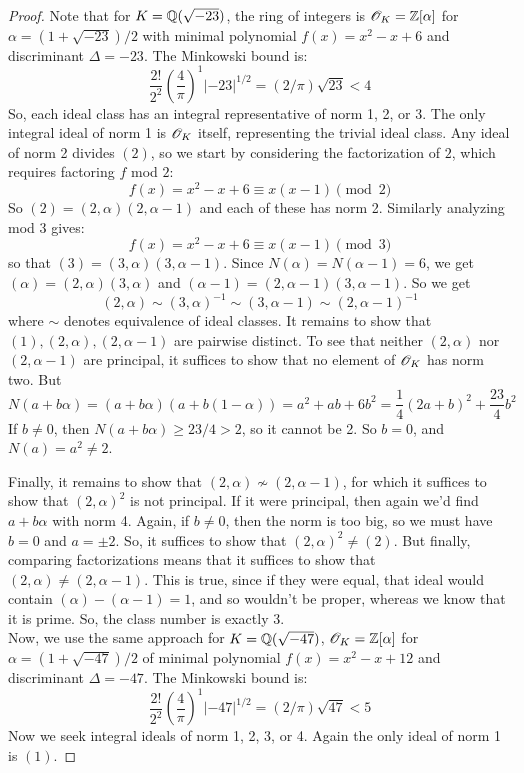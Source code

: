 \begin{proof}
	Note that for $K = \mathbb{Q}(\sqrt{-23})$, the ring of integers is $\mathscr{O}_K = \mathbb{Z}[\alpha]$ for $\alpha = (1+\sqrt{-23})/2$ with minimal polynomial $f(x) = x^2-x+6$ and discriminant $\Delta = -23$. The Minkowski bound is:
	\[ \frac{2!}{2^2}\left(\frac{4}{\pi}\right)^1|-23|^{1/2} = (2/\pi)\sqrt{23} < 4 \]
	So, each ideal class has an integral representative of norm 1, 2, or 3. The only integral ideal of norm 1 is $\mathscr{O}_K$ itself, representing the trivial ideal class. Any ideal of norm 2 divides $(2)$, so we start by considering the factorization of $2$, which requires factoring $f$ mod $2$:
	\[ f(x) = x^2-x+6 \equiv x(x-1) \pmod{2} \]
	So $(2) = (2,\alpha)(2,\alpha-1)$ and each of these has norm 2. Similarly analyzing mod 3 gives:
	\[ f(x) = x^2-x+6 \equiv x(x-1) \pmod{3} \]
	so that $(3) = (3,\alpha)(3,\alpha-1)$. Since $N(\alpha) = N(\alpha-1) = 6$, we get $(\alpha) = (2,\alpha)(3,\alpha)$ and $(\alpha-1) = (2,\alpha-1)(3,\alpha-1)$. So we get
	\[ (2,\alpha) \sim (3,\alpha)^{-1} \sim (3,\alpha-1) \sim (2,\alpha-1)^{-1} \]
	where $\sim$ denotes equivalence of ideal classes. It remains to show that $(1),(2,\alpha),(2,\alpha-1)$ are pairwise distinct. To see that neither $(2,\alpha)$ nor $(2,\alpha-1)$ are principal, it suffices to show that no element of $\mathscr{O}_K$ has norm two. But
	\[ N(a+b\alpha) = (a+b\alpha)(a+b(1-\alpha)) = a^2+ab+6b^2 = \frac{1}{4}(2a+b)^2 + \frac{23}{4}b^2 \]
	If $b \neq 0$, then $N(a+b\alpha) \geq 23/4 > 2$, so it cannot be 2. So $b=0$, and $N(a) = a^2 \neq 2$.
	
	Finally, it remains to show that $(2,\alpha) \not\sim (2,\alpha-1)$, for which it suffices to show that $(2,\alpha)^2$ is not principal. If it were principal, then again we'd find $a+b\alpha$ with norm 4. Again, if $b \neq 0$, then the norm is too big, so we must have $b=0$ and $a = \pm 2$. So, it suffices to show that $(2,\alpha)^2 \neq (2)$. But finally, comparing factorizations means that it suffices to show that $(2,\alpha) \neq (2,\alpha-1)$. This is true, since if they were equal, that ideal would contain $(\alpha)-(\alpha-1) = 1$, and so wouldn't be proper, whereas we know that it is prime. So, the class number is exactly 3. \\
	
	Now, we use the same approach for $K = \mathbb{Q}(\sqrt{-47})$, $\mathscr{O}_K = \mathbb{Z}[\alpha]$ for $\alpha = (1+\sqrt{-47})/2$ of minimal polynomial $f(x) = x^2-x+12$ and discriminant $\Delta = -47$. The Minkowski bound is:
	\[ \frac{2!}{2^2}\left(\frac{4}{\pi}\right)^1|-47|^{1/2} = (2/\pi)\sqrt{47} < 5 \]
	Now we seek integral ideals of norm 1, 2, 3, or 4. Again the only ideal of norm 1 is $(1)$.
	

\end{proof}
